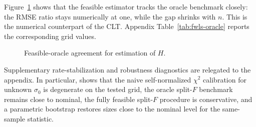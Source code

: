 Figure~\ref{fig:fwls-oracle-gap} shows that the feasible estimator tracks the
oracle benchmark closely: the RMSE ratio stays numerically at one, while the
gap shrinks with $n$. This is the numerical counterpart of the CLT. Appendix
Table~\ref{tab:fwls-oracle} reports the corresponding grid values.

\begin{figure}[!htbp]
\centering
{}
\caption{Feasible-oracle agreement for estimation of $H$.}
\label{fig:fwls-oracle-gap}
\end{figure}
\FloatBarrier

Supplementary rate-stabilization and robustness diagnostics are relegated to
the appendix. In particular,  shows that the naive
self-normalized $\chi^2$ calibration for unknown $\sigma_0$ is degenerate on the
tested grid, the oracle split-$F$ benchmark remains close to nominal, the fully
feasible split-$F$ procedure is conservative, and a parametric bootstrap
restores sizes close to the nominal level for the same-sample statistic.
